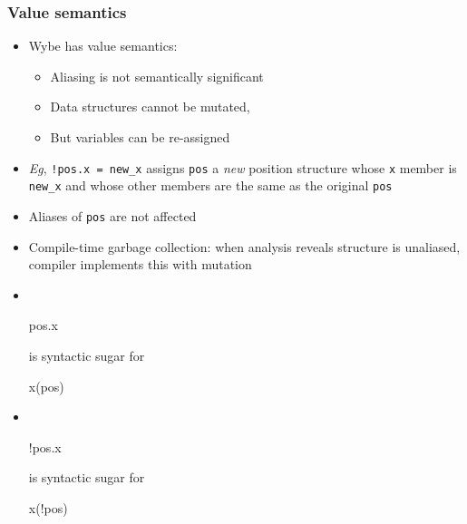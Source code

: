 \documentclass[12pt]{beamer}
\begin{document}
\begin{frame}[fragile]
\frametitle{Value semantics}
\begin{itemize}
\item Wybe has value semantics:
  \begin{itemize}
  \item Aliasing is not semantically significant
  \item Data structures cannot be mutated,
  \item But variables can be re-assigned
  \end{itemize}
\item \emph{Eg}, \texttt{!pos.x = new\_x} assigns \texttt{pos}
  a \emph{new} position structure whose \texttt{x} member is
  \texttt{new\_x} and
  whose other members are the same as the original \texttt{pos}
\item Aliases of \texttt{pos} are not affected
\item Compile-time garbage collection:  when analysis reveals structure is
  unaliased, compiler implements this with mutation
\item \\[-1ex]
  \begin{minipage}{0.15\linewidth}
    \begin{block}{}
\begin{semiverbatim}
pos.x
\end{semiverbatim}
    \end{block}
  \end{minipage}
  \quad is syntactic sugar for \quad
  \begin{minipage}{0.15\linewidth}
    \begin{block}{}
\begin{semiverbatim}
x(pos)
\end{semiverbatim}
    \end{block}
  \end{minipage}
\item \\[-1ex]
  \begin{minipage}{0.15\linewidth}
    \begin{block}{}
\begin{semiverbatim}
!pos.x
\end{semiverbatim}
    \end{block}
  \end{minipage}
  \quad is syntactic sugar for \quad
  \begin{minipage}{0.15\linewidth}
    \begin{block}{}
\begin{semiverbatim}
x(!pos)
\end{semiverbatim}
    \end{block}
  \end{minipage}
\end{itemize}
\end{frame}
\end{document}
